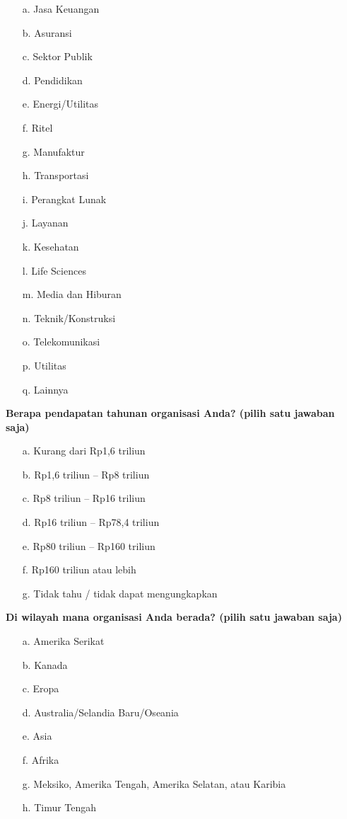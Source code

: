 \documentclass{article}
\begin{document}
\begin{enumerate}
	\item[a.] Jasa Keuangan
	\item[b.] Asuransi
	\item[c.] Sektor Publik
	\item[d.] Pendidikan
	\item[e.] Energi/Utilitas
	\item[f.] Ritel
	\item[g.] Manufaktur
	\item[h.] Transportasi
	\item[i.] Perangkat Lunak
	\item[j.] Layanan
	\item[k.] Kesehatan
	\item[l.] Life Sciences
	\item[m.] Media dan Hiburan
	\item[n.] Teknik/Konstruksi
	\item[o.] Telekomunikasi
	\item[p.] Utilitas
	\item[q.] Lainnya
\end{enumerate}

\textbf{Berapa pendapatan tahunan organisasi Anda? (pilih satu jawaban saja)}

\begin{enumerate}
	\item[a.] Kurang dari Rp1,6 triliun
	\item[b.] Rp1,6 triliun – Rp8 triliun
	\item[c.] Rp8 triliun – Rp16 triliun
	\item[d.] Rp16 triliun – Rp78,4 triliun
	\item[e.] Rp80 triliun – Rp160 triliun
	\item[f.] Rp160 triliun atau lebih
	\item[g.] Tidak tahu / tidak dapat mengungkapkan
\end{enumerate}

\textbf{Di wilayah mana organisasi Anda berada? (pilih satu jawaban saja)}

\begin{enumerate}
	\item[a.] Amerika Serikat
	\item[b.] Kanada
	\item[c.] Eropa
	\item[d.] Australia/Selandia Baru/Oseania
	\item[e.] Asia
	\item[f.] Afrika
	\item[g.] Meksiko, Amerika Tengah, Amerika Selatan, atau Karibia
	\item[h.] Timur Tengah
\end{enumerate}
\end{document}

